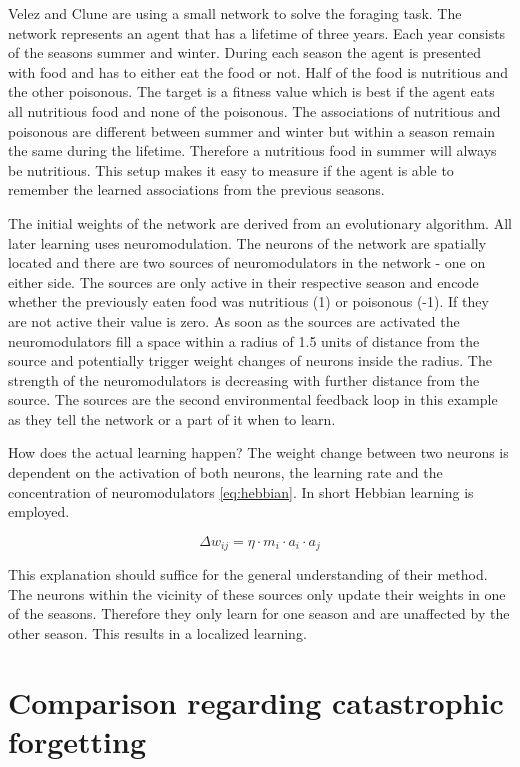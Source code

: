 \documentclass[12pt,twoside]{scrartcl}
\theoremstyle{plain}
\theoremstyle{definition}
\theoremstyle{remark}
\begin{document}
Velez and Clune are using a small network to solve the foraging task. The network
represents an agent that has a lifetime of three years. Each year consists of
the seasons summer and winter. During each season the agent is presented with
food and has to either eat the food or not. Half of the food is nutritious
and the other poisonous. The target is a fitness value which is best if the
agent eats all nutritious food and none of the poisonous. The associations of
nutritious and poisonous are different between summer and winter but within
a season remain the same during the lifetime. Therefore a nutritious food in
summer will always be nutritious.
This setup makes it easy to measure if the agent is able to remember the learned
associations from the previous seasons.

The initial weights of the network are derived from an evolutionary algorithm.
All later learning uses neuromodulation. The neurons of the network are spatially
located and there are two sources of neuromodulators in the network - one on either
side. The sources are only active in their respective season and encode whether
the previously eaten food was nutritious (1) or poisonous (-1). If they are
not active their value is zero. As soon as the sources are activated the neuromodulators
fill a space within a radius of 1.5 units of distance from the source and potentially
trigger weight changes of neurons inside the radius. The strength of the neuromodulators
is decreasing with further distance from the source. The sources are the second
environmental feedback loop in this example as they tell the network or a part of
it when to learn.

How does the actual learning happen? The weight change between two neurons
is dependent on the activation of both neurons, the learning rate and the concentration
of neuromodulators \eqref{eq:hebbian}. In short Hebbian learning is employed.

\begin{equation}\label{eq:hebbian}
    \Delta w_{ij} = \eta \cdot m_i \cdot a_i \cdot a_j
\end{equation}

This explanation should suffice for the general understanding of their method.
The neurons within the vicinity of these sources only update their weights
in one of the seasons. Therefore they only learn for one season and are unaffected
by the other season. This results in a localized learning.

\section{Comparison regarding catastrophic forgetting}
\label{sec:comparison}
\end{document}
